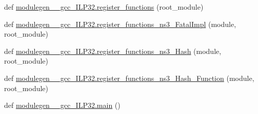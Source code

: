 \begin{DoxyCompactItemize}
\item 
def \hyperlink{namespacemodulegen____gcc__ILP32_a78223e19764a9a9c4a101c5cff0fe501}{modulegen\+\_\+\+\_\+gcc\+\_\+\+I\+L\+P32.\+register\+\_\+functions} (root\+\_\+module)
\item 
def \hyperlink{namespacemodulegen____gcc__ILP32_afe103c28425c708bef38a8cb16badb60}{modulegen\+\_\+\+\_\+gcc\+\_\+\+I\+L\+P32.\+register\+\_\+functions\+\_\+ns3\+\_\+\+Fatal\+Impl} (module, root\+\_\+module)
\item 
def \hyperlink{namespacemodulegen____gcc__ILP32_a15bbba0d88ee02afb1f5d32d8a94ea14}{modulegen\+\_\+\+\_\+gcc\+\_\+\+I\+L\+P32.\+register\+\_\+functions\+\_\+ns3\+\_\+\+Hash} (module, root\+\_\+module)
\item 
def \hyperlink{namespacemodulegen____gcc__ILP32_a0f9329a49ae57d68c45aee88be7a193f}{modulegen\+\_\+\+\_\+gcc\+\_\+\+I\+L\+P32.\+register\+\_\+functions\+\_\+ns3\+\_\+\+Hash\+\_\+\+Function} (module, root\+\_\+module)
\item 
def \hyperlink{namespacemodulegen____gcc__ILP32_aadf64690f6ba129a8d42469ea6da5a2d}{modulegen\+\_\+\+\_\+gcc\+\_\+\+I\+L\+P32.\+main} ()
\end{DoxyCompactItemize}
